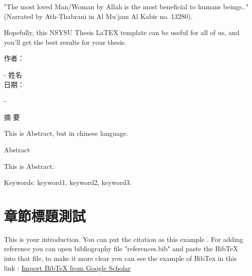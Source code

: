 \documentclass[12pt, twoside , openright]{book}
\begin{document}
	"The most loved Man/Woman by Allah is the most beneficial to humans  beings.." (Narrated by Ath-Thabrani in Al Mu'jam Al Kabir no. 13280).
	
	Hopefully, this NSYSU Thesis LaTEX template can be useful for all of us, and you'll get the best results for your thesis.
	
	\noindent
	作者：
	
	\vspace{-2em}
	- 姓名
	\noindent \\
	日期：

	\vspace{-2em}
	- 
	
	
	\clearpage
	
	
	\begin{center}
		{\chinnesesize 摘 要}
	\end{center}
	This is Abstract, but in chinese language. \blindtext[1]
	\clearpage
	
	
	
	
	
	\begin{center}
		{\chinnesesize Abstract}
	\end{center}
	
	This is Abstract. \blindtext[1]
	
	
	\noindent Keywords: keyword1, keyword2, keyword3.
	\clearpage
	
	
	
	
	\tableofcontents
	\clearpage
	
	
	
	
	\listoffigures
	\clearpage
	
	
	\listoftables
	\let \cleardoublepage \clearpage
	\mainmatter
	
	\chapter{章節標題測試}
	This is your introduction. You can put the citation as this example \cite{CpLi}. For adding reference you can open bibliography file "references.bib" and paste the BibTeX into that file, to make it more clear you can see the example of BibTex in this link : \href{https://www.youtube.com/watch?v=SsJSR2b4_qc&t=107s}{Import BibTeX from Google Scholar}
	
\end{document}
